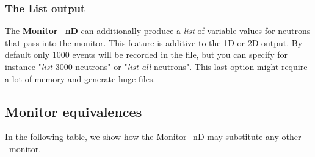 \subsubsection{The List output}

The {\bf Monitor\_nD} can additionally produce a {\it list} of variable
values for neutrons that pass into the monitor. This feature is additive
to the 1D or 2D output. By default only 1000 events will be recorded in
the file, but you can specify for instance "{\it list} 3000 neutrons" or
"{\it list all} neutrons". This last option might require a lot of
memory and generate huge files.

\subsection{Monitor equivalences}

In the following table, we show how the Monitor\_nD may substitute any other \MCS\ monitor.

